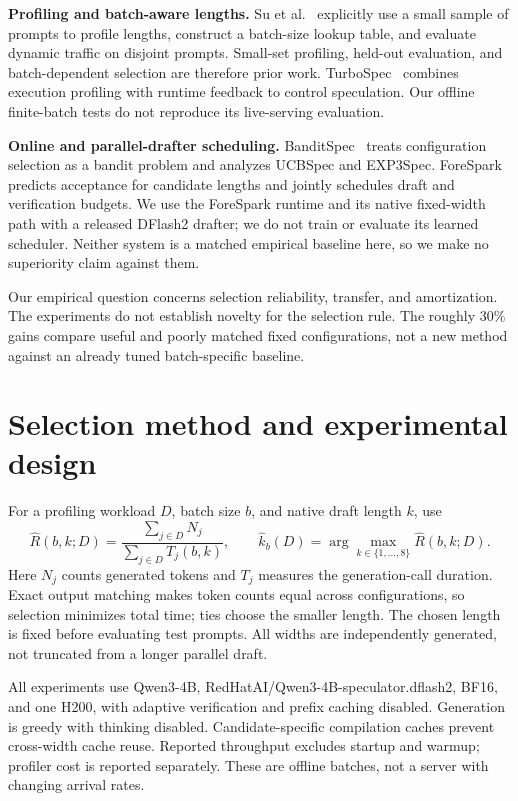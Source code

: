 \documentclass[10pt]{article}
\begin{document}
\textbf{Profiling and batch-aware lengths.} Su et al.~\cite{su} explicitly use a small sample of prompts to profile lengths, construct a batch-size lookup table, and evaluate dynamic traffic on disjoint prompts. Small-set profiling, held-out evaluation, and batch-dependent selection are therefore prior work. TurboSpec~\cite{turbo} combines execution profiling with runtime feedback to control speculation. Our offline finite-batch tests do not reproduce its live-serving evaluation.

\textbf{Online and parallel-drafter scheduling.} BanditSpec~\cite{bandit} treats configuration selection as a bandit problem and analyzes UCBSpec and EXP3Spec. ForeSpark~\cite{fore} predicts acceptance for candidate lengths and jointly schedules draft and verification budgets. We use the ForeSpark runtime and its native fixed-width path with a released DFlash2 drafter; we do not train or evaluate its learned scheduler. Neither system is a matched empirical baseline here, so we make no superiority claim against them.

Our empirical question concerns selection reliability, transfer, and amortization. The experiments do not establish novelty for the selection rule. The roughly 30\% gains compare useful and poorly matched fixed configurations, not a new method against an already tuned batch-specific baseline.

\newpage
\section{Selection method and experimental design}
For a profiling workload $D$, batch size $b$, and native draft length $k$, use
\[
 \widehat R(b,k;D)=\frac{\sum_{j\in D}N_j}{\sum_{j\in D}T_j(b,k)},\qquad
 \widehat k_b(D)=\arg\max_{k\in\{1,\ldots,8\}}\widehat R(b,k;D).
\]
Here $N_j$ counts generated tokens and $T_j$ measures the generation-call duration. Exact output matching makes token counts equal across configurations, so selection minimizes total time; ties choose the smaller length. The chosen length is fixed before evaluating test prompts. All widths are independently generated, not truncated from a longer parallel draft.

All experiments use Qwen3-4B, RedHatAI/Qwen3-4B-speculator.dflash2, BF16, and one H200, with adaptive verification and prefix caching disabled. Generation is greedy with thinking disabled. Candidate-specific compilation caches prevent cross-width cache reuse. Reported throughput excludes startup and warmup; profiler cost is reported separately. These are offline batches, not a server with changing arrival rates.
\end{document}
